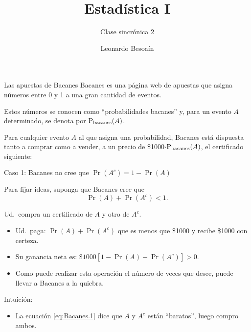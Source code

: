 \documentclass[9pt,handout]{beamer}
\author[]{\texorpdfstring{Leonardo Besoaín }{Author}}
\title{Estadística I}
\date{}
\subtitle{Clase sincrónica 2}
\begin{document}
\begin{frame}
\titlepage
\end{frame}


\begin{frame}{Las apuestas de Bacanes}
\justifying
Bacanes es una página web de apuestas
que 
 asigna
números entre 0 y 1 a una gran cantidad
de eventos. 

\bigskip 

Estos números se conocen
como ``probabilidades bacanes'' y, para
un evento $A$ determinado,  se denota
por ${\rm P}_{\rm bacanes}(A)$. 

\bigskip

Para cualquier evento $A$ al que
asigna una probabilidad, 
Bacanes está dispuesta tanto a comprar
como a vender, a un precio de \$1000$\cdot{\rm P}_{\rm bacanes}(A)$,
el certificado siguiente:

\bigskip

\begin{center}
\end{center}    
\end{frame}

\begin{frame}{Caso 1: Bacanes no cree que $\Pr(A^c)=1-\Pr(A)$}

Para fijar ideas, suponga que Bacanes
cree que
\begin{equation}
\label{eq:Bacanes.1}
\Pr(A) + \Pr(A^c) < 1.
\end{equation}

\bigskip

Ud.\ compra un certificado de $A$ y otro de $A^c$. 

\begin{itemize}
\item Ud.\ paga: $\Pr(A)+\Pr(A^c)$ que es menos que \$1000 y 
recibe \$1000 con certeza. 
\item Su ganancia neta es: $\$1000[1-\Pr(A)-\Pr(A^c)] > 0$. 
\item Como puede realizar esta operación el número de veces que desee, puede llevar a Bacanes a la quiebra.
\end{itemize}

\bigskip

\alert{Intuición}: 
\begin{itemize}
\item La ecuación \eqref{eq:Bacanes.1} dice
que $A$ y $A^c$ están ``baratos'', luego
compro ambos. 
\end{itemize}
\end{frame}
\end{document}
